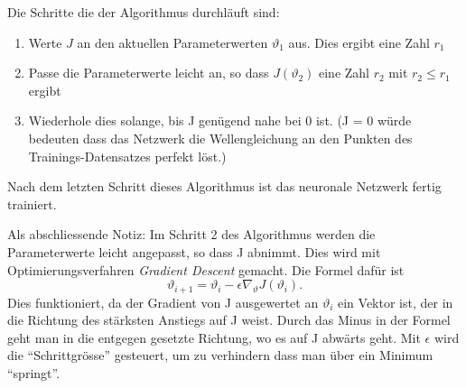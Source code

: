 Die Schritte die der Algorithmus durchläuft sind:
\begin{enumerate}
    \item Werte \( J \) an den aktuellen Parameterwerten \( \vartheta_1 \) aus. Dies ergibt eine Zahl \( r_1 \)
    \item Passe die Parameterwerte leicht an, so dass \( J(\vartheta_2) \) eine Zahl \( r_2 \) mit \( r_2 \leq r_1 \) ergibt
    \item Wiederhole dies solange, bis J genügend nahe bei 0 ist. (J = 0 würde bedeuten dass das Netzwerk die Wellengleichung an den Punkten des Trainings-Datensatzes perfekt löst.)
\end{enumerate}

Nach dem letzten Schritt dieses Algorithmus ist das neuronale Netzwerk fertig trainiert.

Als abschliessende Notiz: Im Schritt 2 des Algorithmus werden die Parameterwerte leicht angepasst, so dass J abnimmt.
Dies wird mit Optimierungsverfahren \emph{Gradient Descent} gemacht. Die Formel dafür ist
\begin{equation}
    \vartheta_{i+1} = \vartheta_i - \epsilon \nabla_\vartheta J\left(\vartheta_i\right).
\end{equation}
Dies funktioniert, da der Gradient von J ausgewertet an \( \vartheta_i \) ein Vektor ist, der in die Richtung des stärksten Anstiegs auf J weist.
Durch das Minus in der Formel geht man in die entgegen gesetzte Richtung, wo es auf J abwärts geht. 
Mit \( \epsilon \) wird die ``Schrittgrösse'' gesteuert, um zu verhindern dass man über ein Minimum ``springt''.
